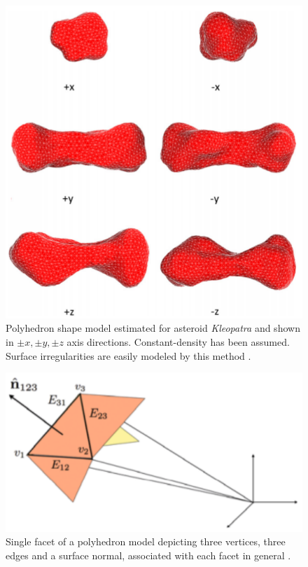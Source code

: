 \begin{figure}[htb]
\centering
\captionsetup{justification=centering}
\includegraphics[width=\textwidth, height=0.3\textheight, keepaspectratio=true]{polyhedra_example.pdf}
\caption{Polyhedron shape model estimated for asteroid \textit{Kleopatra} and shown in $\pm x, \pm y, \pm z$ axis directions. Constant-density has been assumed. Surface irregularities are easily modeled by this method \parencite{polyhedra_example}.}
\label{fig:polyhedron_example}
\end{figure}
\FloatBarrier
\begin{figure}[htb]
\centering
\captionsetup{justification=centering}
\includegraphics[width=\textwidth, height=0.2\textheight, keepaspectratio=true]{single_facet.pdf}
\caption{Single facet of a polyhedron model depicting three vertices, three edges and a surface normal, associated with each facet in general \parencite{scheeresBook}.}
\label{fig:single_facet}
\end{figure}
